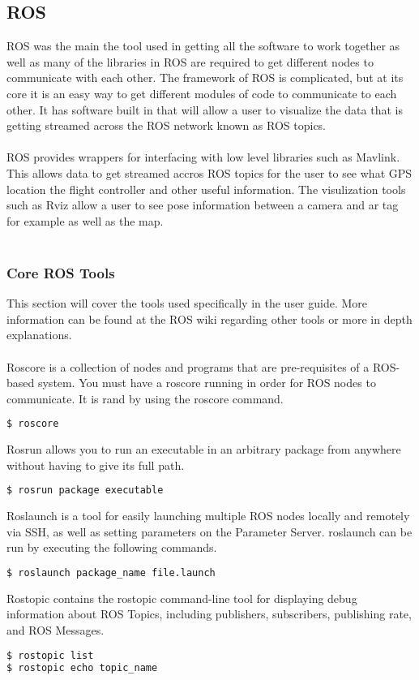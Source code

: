 \subsection{ROS}
ROS was the main the tool used in getting all the software to work together as well as many of the libraries in ROS are required to get different nodes to communicate with each other. The framework of ROS is complicated, but at its core it is an easy way to get different modules of code to communicate to each other. It has software built in that will allow a user to visualize the data that is getting streamed across the ROS network known as ROS topics.\\
\\
ROS provides wrappers for interfacing with low level libraries such as Mavlink. This allows data to get streamed accros ROS topics for the user to see what GPS location the flight controller and other useful information. The visulization tools such as Rviz allow a user to see pose information between a camera and ar tag for example as well as the map.\\
\\
\subsubsection{Core ROS Tools}
This section will cover the tools used specifically in the user guide. More information can be found at the ROS wiki regarding other tools or more in depth explanations.\\
\\
Roscore is a collection of nodes and programs that are pre-requisites of a ROS-based system. You must have a roscore running in order for ROS nodes to communicate. It is rand by using the roscore command.
\begin{lstlisting}[language=bash]
$ roscore
\end{lstlisting}
Rosrun allows you to run an executable in an arbitrary package from anywhere without having to give its full path.
\begin{lstlisting}[language=bash]
$ rosrun package executable
\end{lstlisting}
Roslaunch is a tool for easily launching multiple ROS nodes locally and remotely via SSH, as well as setting parameters on the Parameter Server. roslaunch can be run by executing the following commands.
\begin{lstlisting}[language=bash]
$ roslaunch package_name file.launch
\end{lstlisting}
Rostopic contains the rostopic command-line tool for displaying debug information about ROS Topics, including publishers, subscribers, publishing rate, and ROS Messages.
\begin{lstlisting}[language=bash]
$ rostopic list
$ rostopic echo topic_name
\end{lstlisting}
